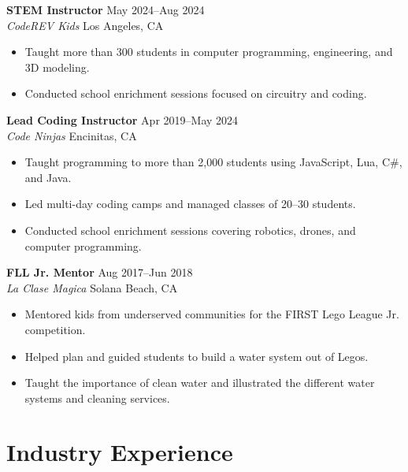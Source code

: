 \documentclass[11pt]{article}
\begin{document}
\vspace{0.4em}

\noindent
    \textbf{STEM Instructor} \hfill May 2024--Aug 2024\\
    \textit{CodeREV Kids} \hfill Los Angeles, CA
    \begin{itemize}
        \item Taught more than 300 students in computer programming, engineering, and 3D modeling.
        \item Conducted school enrichment sessions focused on circuitry and coding.
    \end{itemize}

\vspace{0.4em}

\noindent
    \textbf{Lead Coding Instructor} \hfill Apr 2019--May 2024\\
    \textit{Code Ninjas} \hfill Encinitas, CA
    \begin{itemize}
        \item Taught programming to more than 2,000 students using JavaScript, Lua, C\#, and Java.
        \item Led multi-day coding camps and managed classes of 20--30 students.
        \item Conducted school enrichment sessions covering robotics, drones, and computer programming.
    \end{itemize}

\vspace{0.4em}

\noindent
    \textbf{FLL Jr. Mentor} \hfill Aug 2017--Jun 2018\\
    \textit{La Clase Magica} \hfill Solana Beach, CA
    \begin{itemize}
        \item Mentored kids from underserved communities for the FIRST Lego League Jr. competition.
        \item Helped plan and guided students to build a water system out of Legos.
        \item Taught the importance of clean water and illustrated the different water systems and cleaning services.
    \end{itemize}


\section{Industry Experience}
\end{document}
